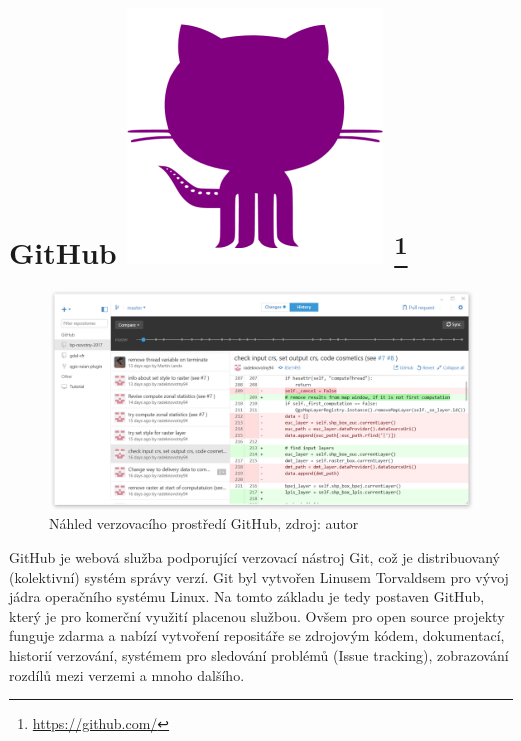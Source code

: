 \section[GitHub]{GitHub \includegraphics[scale=0.06]{./pictures/github.png} 
\footnote{\url{https://github.com/}}}
\label{github}
\begin{figure}[H]
    \centering \includegraphics[scale=0.45]{./pictures/github_screen.png}
      \caption[Náhled verzovacího prostředí GitHub]
      {Náhled verzovacího prostředí GitHub, zdroj: autor}
      \label{screen:github}
\end{figure}
GitHub je webová služba podporující verzovací nástroj Git, což je
distribuovaný (kolektivní) systém správy verzí. Git byl vytvořen
Linusem Torvaldsem pro vývoj jádra operačního systému Linux. Na 
tomto základu je tedy postaven GitHub, který je pro komerční využití 
placenou službou. Ovšem 
pro open source projekty funguje zdarma a nabízí vytvoření repositáře se
zdrojovým kódem, dokumentací, historií verzování, systémem pro
sledování problémů (Issue tracking), zobrazování rozdílů mezi verzemi
a mnoho dalšího.\cite{introducingGithub}

